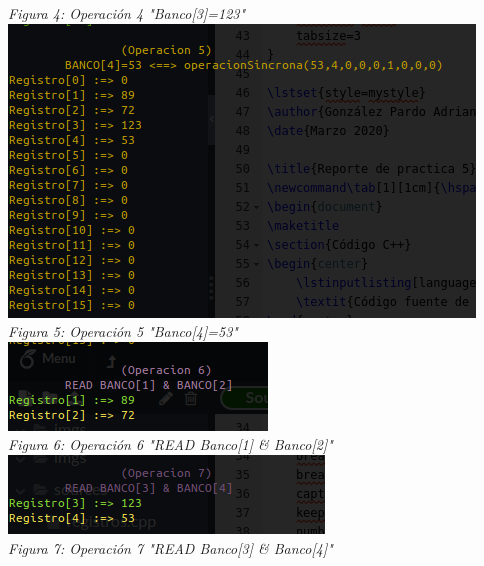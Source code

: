 \documentclass[12pt,executivepaper]{article}
\begin{document}
\begin{center}
    \textit{Figura 4: Operación 4 "Banco[3]=123"}\\
    \includegraphics[scale=0.9]{imgs/seis.png}\\
    \textit{Figura 5: Operación 5 "Banco[4]=53"}\\
    \includegraphics[scale=1]{imgs/siete.png}\\
    \textit{Figura 6: Operación 6 "READ Banco[1] \& Banco[2]"}\\
    \includegraphics[scale=1]{imgs/ocho.png}\\
    \textit{Figura 7: Operación 7 "READ Banco[3] \& Banco[4]"}\\
    

\end{center}
\end{document}
